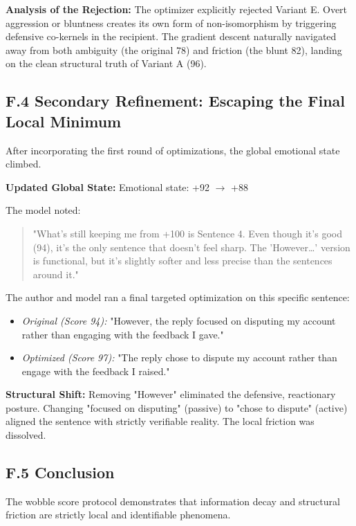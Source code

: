 \textbf{Analysis of the Rejection:} The optimizer explicitly rejected Variant E. Overt aggression or bluntness creates its own form of non-isomorphism by triggering defensive co-kernels in the recipient. The gradient descent naturally navigated away from both ambiguity (the original 78) and friction (the blunt 82), landing on the clean structural truth of Variant A (96).

\subsection*{F.4 Secondary Refinement: Escaping the Final Local Minimum}

After incorporating the first round of optimizations, the global emotional state climbed.

\textbf{Updated Global State:} Emotional state: +92 $\to$ +88

The model noted:

\begin{quote}"What's still keeping me from +100 is Sentence 4. Even though it's good (94), it's the only sentence that doesn't feel sharp. The 'However\ldots{}' version is functional, but it's slightly softer and less precise than the sentences around it."\end{quote}

The author and model ran a final targeted optimization on this specific sentence:

\begin{itemize}
\item \emph{Original (Score 94):} "However, the reply focused on disputing my account rather than engaging with the feedback I gave."
\item \emph{Optimized (Score 97):} "The reply chose to dispute my account rather than engage with the feedback I raised."
\end{itemize}

\textbf{Structural Shift:} Removing "However" eliminated the defensive, reactionary posture. Changing "focused on disputing" (passive) to "chose to dispute" (active) aligned the sentence with strictly verifiable reality. The local friction was dissolved.

\subsection*{F.5 Conclusion}

The wobble score protocol demonstrates that information decay and structural friction are strictly local and identifiable phenomena.

